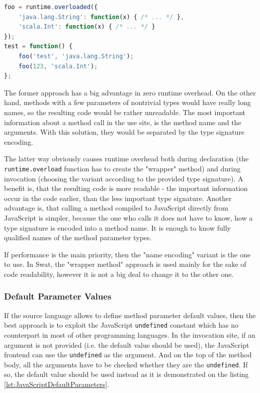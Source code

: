 \documentclass[12pt,a4paper]{report}
\begin{document}
\begin{lstlisting}[language=JavaScript,caption={Overloading in JavaScript.},label={lst:WrapperFunction}]
foo = runtime.overloaded({
	'java.lang.String': function(x) { /* ... */ },
	'scala.Int': function(x) { /* ... */ }
});
test = function() {
	foo('test', 'java.lang.String');
	foo(123, 'scala.Int');
};
\end{lstlisting}

The former approach has a big advantage in zero runtime overhead. On the other hand, methods with a few parameters of nontrivial types would have really long names, so the resulting code would be rather unreadable.
The most important information about a method call in the use site, is the method name and the arguments. With this solution, they would be separated by the type signature encoding.

The latter way obviously causes runtime overhead both during declaration (the \texttt{runtime.overload} function has to create the "wrapper" method) and during invocation (choosing the variant according to the provided type signature). A benefit is, that the resulting code is more readable - the important information occur in the code earlier, than the less important type signature. Another advantage is, that calling a method compiled to JavaScript directly from JavaScript is simpler, because the one who calls it does not have to know, how a type signature is encoded into a method name. It is enough to know fully qualified names of the method parameter types.

If performance is the main priority, then the "name encoding" variant is the one to use. In Swat, the "wrapper method" approach is used mainly for the sake of code readability, however it is not a big deal to change it to the other one.

\subsubsection*{Default Parameter Values}

If the source language allows to define method parameter default values, then the best approach is to exploit the JavaScript \texttt{undefined} constant which has no counterpart in most of other programming languages. In the invocation site, if an argument is not provided (i.e. the default value should be used), the JavaScript frontend can use the \texttt{undefined} as the argument. And on the top of the method body, all the arguments have to be checked whether they are the \texttt{undefined}. If so, the default value should be used instead as it is demonstrated on the listing \ref{lst:JavaScriptDefaultParameters}.
\end{document}
